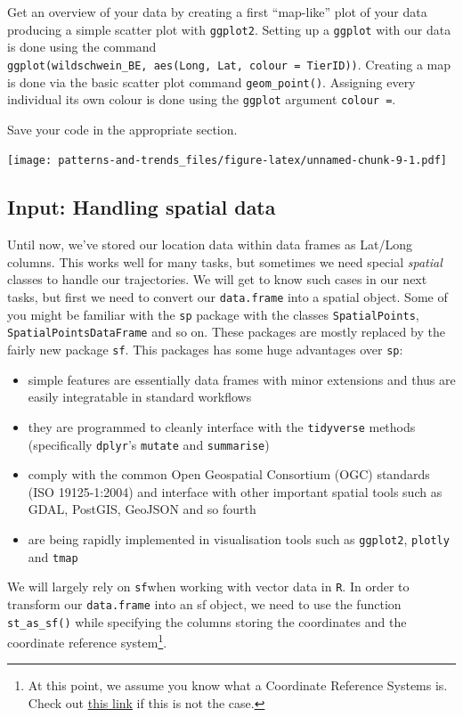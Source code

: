 \documentclass[]{book}
\providecommand{\tightlist}{%
  \setlength{\itemsep}{0pt}\setlength{\parskip}{0pt}}
\let\rmarkdownfootnote\footnote%
\def\footnote{\protect\rmarkdownfootnote}
\begin{document}
Get an overview of your data by creating a first ``map-like'' plot of your data producing a simple scatter plot with \texttt{ggplot2}.
Setting up a \texttt{ggplot} with our data is done using the command \texttt{ggplot(wildschwein\_BE,\ aes(Long,\ Lat,\ colour\ =\ TierID))}. Creating a map is done via the basic scatter plot command \texttt{geom\_point()}.
Assigning every individual its own colour is done using the \texttt{ggplot} argument \texttt{colour\ =}.

Save your code in the appropriate section.

\texttt{[image: patterns-and-trends\_files/figure-latex/unnamed-chunk-9-1.pdf]}

\hypertarget{input-handling-spatial-data}{%
\subsection{Input: Handling spatial data}\label{input-handling-spatial-data}}

Until now, we've stored our location data within data frames as Lat/Long columns. This works well for many tasks, but sometimes we need special \emph{spatial} classes to handle our trajectories. We will get to know such cases in our next tasks, but first we need to convert our \texttt{data.frame} into a spatial object.
Some of you might be familiar with the \texttt{sp} package with the classes \texttt{SpatialPoints}, \texttt{SpatialPointsDataFrame} and so on. These packages are mostly replaced by the fairly new package \texttt{sf}. This packages has some huge advantages over \texttt{sp}:

\begin{itemize}
\tightlist
\item
  simple features are essentially data frames with minor extensions and thus are easily integratable in standard workflows
\item
  they are programmed to cleanly interface with the \texttt{tidyverse} methods (specifically \texttt{dplyr}'s \texttt{mutate} and \texttt{summarise})
\item
  comply with the common Open Geospatial Consortium (OGC) standards (ISO 19125-1:2004) and interface with other important spatial tools such as GDAL, PostGIS, GeoJSON and so fourth
\item
  are being rapidly implemented in visualisation tools such as \texttt{ggplot2}, \texttt{plotly} and \texttt{tmap}
\end{itemize}

We will largely rely on \texttt{sf}when working with vector data in \texttt{R}. In order to transform our \texttt{data.frame} into an sf object, we need to use the function \texttt{st\_as\_sf()} while specifying the columns storing the coordinates and the coordinate reference system\footnote{At this point, we assume you know what a Coordinate Reference Systems is. Check out \href{https://earthdatascience.org/courses/earth-analytics/spatial-data-r/intro-to-coordinate-reference-systems/}{this link} if this is not the case.}.
\end{document}
